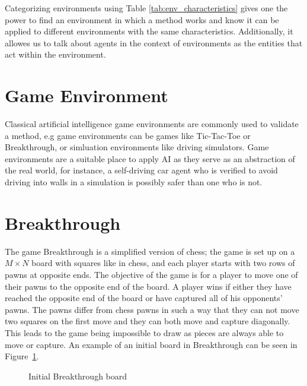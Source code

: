 Categorizing environments using Table \ref{tab:env_characteristics} gives one the power to find an environment in which a method works and know it can be applied to different environments with the same characteristics. Additionally, it allowes us to talk about agents in the context of environments as the entities that act within the environment.

\section{Game Environment}

Classical artificial intelligence game environments are commonly used to validate a method, e.g game environments can be games like Tic-Tac-Toe or Breakthrough, or simluation environments like driving simulators. Game environments are a suitable place to apply AI as they serve as an abstraction of the real world, for instance, a self-driving car agent who is verified to avoid driving into walls in a simulation is possibly safer than one who is not.

\section{Breakthrough}

The game Breakthrough is a simplified version of chess; the game is set up on a $M\times N$ board with squares like in chess, and each player starts with two rows of pawns at opposite ends. The objective of the game is for a player to move one of their pawns to the opposite end of the board. A player wins if either they have reached the opposite end of the board or have captured all of his opponents' pawns. The pawns differ from chess pawns in such a way that they can not move two squares on the first move and they can both move and capture diagonally. This leads to the game being impossible to draw as pieces are always able to move or capture. An example of an initial board in Breakthrough can be seen in Figure~\ref{fig:initbtboard}. 

\begin{figure}[]
	\centering


	\caption{Initial Breakthrough board}
	\label{fig:initbtboard}
\end{figure}


